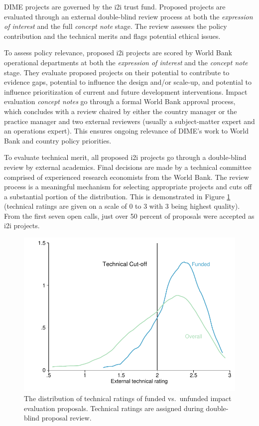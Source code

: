 DIME projects are governed by the i2i trust fund. Proposed projects are evaluated through an external double-blind review process at both the \emph{expression of interest} and the full \emph{concept note} stage. The review assesses the policy contribution and the technical merits and flags potential ethical issues.

To assess policy relevance, proposed i2i projects are scored by World Bank operational departments at both the \emph{expression of interest} and the \emph{concept note} stage. They evaluate proposed projects on their potential to contribute to evidence gaps, potential to influence the design and/or scale-up, and potential to influence prioritization of current and future development interventions. Impact evaluation \emph{concept notes} go through a formal World Bank approval process, which concludes with a review chaired by either the country manager or the practice manager and two external reviewers (usually a subject-matter expert and an operations expert). This ensures ongoing relevance of DIME's work to World Bank and country policy priorities.

To evaluate technical merit, all proposed i2i projects go through a double-blind review by external academics. Final decisions are made by a technical committee comprised of experienced research economists from the World Bank. The review process is a meaningful mechanism for selecting appropriate projects and cuts off a substantial portion of the distribution. This is demonstrated in Figure \ref{fig:dimefigure5} (technical ratings are given on a scale of 0 to 3 with 3 being highest quality). From the first seven open calls, just over 50 percent of proposals were accepted as i2i projects.

\begin{figure}
\centering
\includegraphics{./figures/dimeFigure5-mod} \caption{The distribution of technical ratings of funded vs.\ unfunded impact evaluation proposals. Technical ratings are assigned during double-blind proposal  review.}\label{fig:dimefigure5}
\end{figure}


